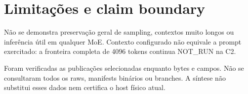 \section{Limitações e claim boundary}
Não se demonstra preservação geral de sampling, contextos muito longos ou inferência útil em qualquer MoE. Contexto configurado não equivale a prompt exercitado: a fronteira completa de 4096 tokens continua NOT\_RUN na C2. 

Foram verificadas as publicações selecionadas enquanto bytes e campos. Não se consultaram todos os raws, manifests binários ou branches. A síntese não substitui esses dados nem certifica o host físico atual.
